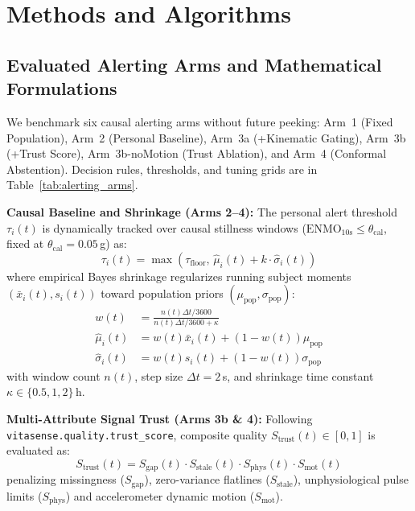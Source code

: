 \documentclass[conference]{IEEEtran}
\begin{document}
\section{Methods and Algorithms}
\subsection{Evaluated Alerting Arms and Mathematical Formulations}
We benchmark six causal alerting arms without future peeking: Arm~1 (Fixed Population), Arm~2 (Personal Baseline), Arm~3a (+Kinematic Gating), Arm~3b (+Trust Score), Arm~3b-noMotion (Trust Ablation), and Arm~4 (Conformal Abstention). Decision rules, thresholds, and tuning grids are in Table~\ref{tab:alerting_arms}.

\textbf{Causal Baseline and Shrinkage (Arms 2--4):}
The personal alert threshold $\tau_i(t)$ is dynamically tracked over causal stillness windows ($\text{ENMO}_{10\text{s}} \le \theta_{\text{cal}}$, fixed at $\theta_{\text{cal}} = 0.05$\,g) as:
\begin{equation}
\tau_i(t) = \max\left(\tau_{\text{floor}},\, \hat{\mu}_i(t) + k \cdot \hat{\sigma}_i(t)\right)
\label{eq:causal_baseline}
\end{equation}
where empirical Bayes shrinkage regularizes running subject moments $(\bar{x}_i(t), s_i(t))$ toward population priors $(\mu_{\text{pop}}, \sigma_{\text{pop}})$:
\begin{align}
w(t) &= \frac{n(t)\Delta t / 3600}{n(t)\Delta t / 3600 + \kappa} \label{eq:shrinkage_weight} \\
\hat{\mu}_i(t) &= w(t)\bar{x}_i(t) + (1 - w(t))\mu_{\text{pop}} \label{eq:shrinkage_mu} \\
\hat{\sigma}_i(t) &= w(t)s_i(t) + (1 - w(t))\sigma_{\text{pop}} \label{eq:shrinkage_sigma}
\end{align}
with window count $n(t)$, step size $\Delta t = 2$\,s, and shrinkage time constant $\kappa \in \{0.5, 1, 2\}$\,h.

\textbf{Multi-Attribute Signal Trust (Arms 3b \& 4):}
Following \texttt{vitasense.quality.trust\_score}, composite quality $S_{\text{trust}}(t) \in [0, 1]$ is evaluated as:
\begin{equation}
S_{\text{trust}}(t) = S_{\text{gap}}(t) \cdot S_{\text{stale}}(t) \cdot S_{\text{phys}}(t) \cdot S_{\text{mot}}(t)
\label{eq:trust_score}
\end{equation}
penalizing missingness ($S_{\text{gap}}$), zero-variance flatlines ($S_{\text{stale}}$), unphysiological pulse limits ($S_{\text{phys}}$) and accelerometer dynamic motion ($S_{\text{mot}}$).
\end{document}

